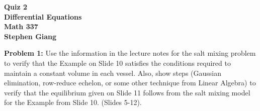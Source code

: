 \documentclass[12pt]{article}
\begin{document}
	
	\begin{center}
		\textbf{Quiz 2} \\
		\textbf{Differential Equations} \\
		\textbf{Math 337} \\
		\textbf{Stephen Giang} \\
	\end{center}

\noindent \textbf{Problem 1: }Use the information in the lecture notes for the salt mixing problem to verify that the
Example on Slide 10 satisfies the conditions required to maintain a constant volume in each vessel.
Also, show steps (Gaussian elimination, row-reduce echelon, or some other technique from Linear
Algebra) to verify that the equilibrium given on Slide 11 follows from the salt mixing model for the
Example from Slide 10. (Slides 5-12).
\end{document}
